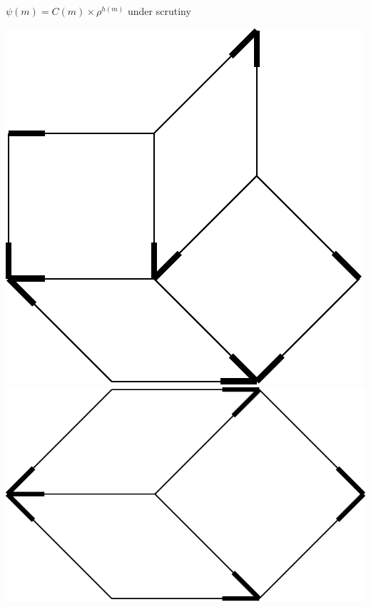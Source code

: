 \documentclass[xcolor=x11names,compress,professionalfonts, aspectratio=169]{beamer}
\renewcommand{\(}{\begin{columns}}
\renewcommand{\)}{\end{columns}}
\newcommand{\<}[1]{\begin{column}{#1}}
\renewcommand{\>}{\end{column}}
\begin{document}
\begin{frame}{$\psi(m) = C(m) \times \rho^{h(m)}$ under scrutiny}
{\includegraphics[scale=\s]{img/env_E.pdf}
\includegraphics[scale=\s]{img/env_F.pdf}

}
\end{frame}
\end{document}
